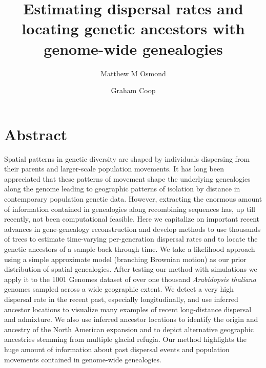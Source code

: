 \documentclass[12pt]{article}
\title{Estimating dispersal rates and locating genetic ancestors with genome-wide genealogies}
\author[1]{Matthew M Osmond}
\author[2]{Graham Coop}
\affil[1]{Department of Ecology \& Evolutionary Biology, University of Toronto}
\affil[2]{Department of Evolution \& Ecology and Center for Population Biology, University of California - Davis}
\date{}
\begin{document}

\maketitle

\section*{Abstract}

Spatial patterns in genetic diversity are shaped by individuals dispersing from their parents and larger-scale population movements. 
It has long been appreciated that these patterns of movement shape the underlying genealogies along the genome leading to geographic patterns of isolation by distance in contemporary population genetic data.
However, extracting the enormous amount of information contained in genealogies along recombining sequences has, up till recently, not been computational feasible.
Here we capitalize on important recent advances in gene-genealogy reconstruction and develop methods to use thousands of trees to estimate time-varying per-generation dispersal rates and to locate the genetic ancestors of a sample back through time.
We take a likelihood approach using a simple approximate model (branching Brownian motion) as our prior distribution of spatial genealogies. 
After testing our method with simulations we apply it to the 1001 Genomes dataset of over one thousand \textit{Arabidopsis thaliana} genomes sampled across a wide geographic extent. 
We detect a very high dispersal rate in the recent past, especially longitudinally, and use inferred ancestor locations to visualize many examples of recent long-distance dispersal and admixture. 
We also use inferred ancestor locations to identify the origin and ancestry of the North American expansion and to depict alternative geographic ancestries stemming from multiple glacial refugia. 
Our method highlights the huge amount of information about past dispersal events and population movements contained in genome-wide genealogies.  
\end{document}
